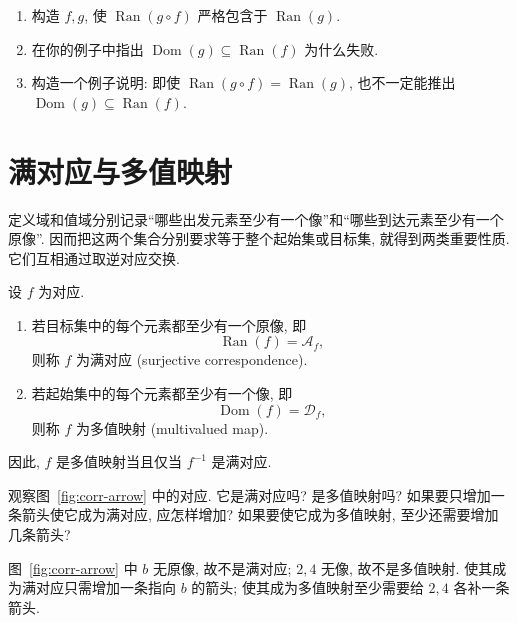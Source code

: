 \documentclass[usesamecnt, thmcnt=section, lang=cn, newtx, 10pt, scheme=chinese]{elegantbook}
\begin{document}
\begin{exercise}\label{ex:corr-composition-image}
\begin{enumerate}[label=\rm(\arabic*)]
  \item 构造 $f,g$, 使 $\operatorname{Ran}(g\circ f)$ 严格包含于 $\operatorname{Ran}(g)$.
  \item 在你的例子中指出 $\operatorname{Dom}(g)\subseteq\operatorname{Ran}(f)$ 为什么失败.
  \item 构造一个例子说明: 即使 $\operatorname{Ran}(g\circ f)=\operatorname{Ran}(g)$, 也不一定能推出 $\operatorname{Dom}(g)\subseteq\operatorname{Ran}(f)$.
\end{enumerate}
\end{exercise}

\section{满对应与多值映射}

定义域和值域分别记录``哪些出发元素至少有一个像''和``哪些到达元素至少有一个原像''. 因而把这两个集合分别要求等于整个起始集或目标集, 就得到两类重要性质. 它们互相通过取逆对应交换.

\begin{definition}[满对应与多值映射]\label{def:corr-surjective-multivalued}
设 $f$ 为对应.
\begin{enumerate}[label=\rm(\arabic*)]
  \item 若目标集中的每个元素都至少有一个原像, 即
  \[
   \operatorname{Ran}(f)=\mathscr A_f,
  \]
  则称 $f$ 为{\color{blue}满对应 (surjective correspondence)}. 
  \item 若起始集中的每个元素都至少有一个像, 即
  \[
   \operatorname{Dom}(f)=\mathscr D_f,
  \]
  则称 $f$ 为{\color{blue}多值映射 (multivalued map)}.
\end{enumerate}
因此, $f$ 是多值映射当且仅当 $f^{-1}$ 是满对应.
\end{definition}

\begin{concept}\label{con:corr-07}
观察图~\ref{fig:corr-arrow} 中的对应. 它是满对应吗? 是多值映射吗? 如果要只增加一条箭头使它成为满对应, 应怎样增加? 如果要使它成为多值映射, 至少还需要增加几条箭头?
\end{concept}

\begin{solution}
图~\ref{fig:corr-arrow} 中 $b$ 无原像, 故不是满对应; $2,4$ 无像, 故不是多值映射. 使其成为满对应只需增加一条指向 $b$ 的箭头; 使其成为多值映射至少需要给 $2,4$ 各补一条箭头.
\end{solution}
\end{document}
